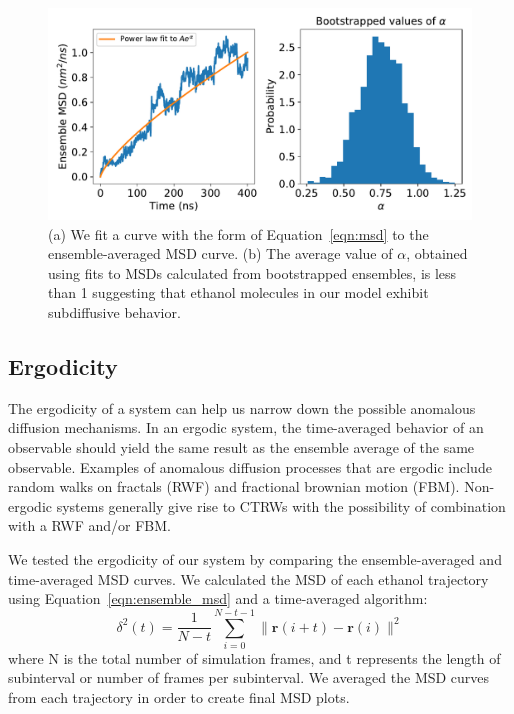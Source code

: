 \documentclass{article}
\begin{document}
  \begin{figure}[!htb]
  \centering
  \includegraphics[width=0.8\linewidth]{msd_power_law.pdf}
  \caption{(a) We fit a curve with the form of Equation~\ref{eqn:msd} to the
	  ensemble-averaged MSD curve. (b) The average value of $\alpha$, obtained using
	  fits to MSDs calculated from bootstrapped ensembles, is less than 1 suggesting
	  that ethanol molecules in our model exhibit subdiffusive
	  behavior.}\label{fig:msd_power_law}
  \end{figure}

  \subsection*{Ergodicity}

  The ergodicity of a system can help us narrow down the possible anomalous
  diffusion mechanisms. In an ergodic system, the time-averaged behavior of an
  observable should yield the same result as the ensemble average of the same
  observable. Examples of anomalous diffusion processes that are ergodic include
  random walks on fractals (RWF) and fractional brownian motion (FBM).
  Non-ergodic systems generally give rise to CTRWs with the possibility of
  combination with a RWF and/or FBM.\cite{meroz_toolbox_2015} 

  We tested the ergodicity of our system by comparing the ensemble-averaged
  and time-averaged MSD curves. We calculated the MSD of each ethanol trajectory
  using Equation~\ref{eqn:ensemble_msd} and a time-averaged algorithm: 
  \begin{equation}
	\delta^2(t) = \dfrac{1}{N-t} \sum_{i=0}^{N-t-1} \| \mathbf{r}(i + t) - \mathbf{r}(i) \|^2
  \end{equation}
  where N is the total number of simulation frames, and t represents the length
  of subinterval or number of frames per subinterval. We averaged the MSD curves
  from each trajectory in order to create final MSD plots.
\end{document}
